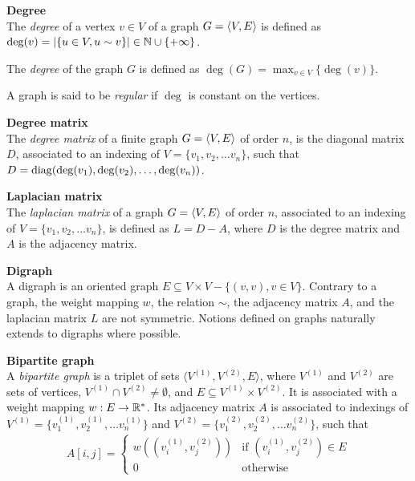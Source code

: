 \begin{definition}\textbf{Degree}\\
The \emph{degree} of a vertex $v \in V$ of a graph $G = \langle V, E \rangle$ is defined as $\deg(v) = |\{u \in V, u \sim v\}| \in \mathbb{N} \cup \{+\infty\}$.

The \emph{degree} of the graph $G$ is defined as $\deg(G) = \displaystyle \max_{v \in V}\{\deg(v)\}$.

A graph is said to be \emph{regular} if $\deg$ is constant on the vertices.
\end{definition}

\begin{definition}\textbf{Degree matrix}\\
The \emph{degree matrix} of a finite graph $G = \langle V, E \rangle$ of order $n$, is the diagonal matrix $D$, associated to an indexing of $V = \{v_1, v_2, \ldots v_n\}$, such that $D = \operatorname{diag}(\deg(v_1), \deg(v_2), \ldots, \deg(v_n))$.
\end{definition}

\begin{definition}\textbf{Laplacian matrix}\\
The \emph{laplacian matrix} of a graph $G = \langle V, E \rangle$ of order $n$, associated to an indexing of $V = \{v_1, v_2, \ldots v_n\}$, is defined as $L = D - A$, where $D$ is the degree matrix and $A$ is the adjacency matrix.
\end{definition}

\begin{definition}\textbf{Digraph}\\
A digraph is an oriented graph \ie $E \subseteq V \times V - \{(v,v), v \in V\}$. Contrary to a graph, the weight mapping $w$, the relation $\sim$, the adjacency matrix $A$, and the laplacian matrix $L$ are not symmetric. Notions defined on graphs naturally extends to digraphs where possible.
\end{definition}

\begin{definition}\textbf{Bipartite graph}\\
A \emph{bipartite graph} is a triplet of sets $\langle V^{(1)}, V^{(2)}, E \rangle$, where $V^{(1)}$ and $V^{(2)}$ are sets of vertices, $V^{(1)} \cap V^{(2)} \neq \emptyset$, and $E \subseteq V^{(1)} \times V^{(2)}$. It is associated with a weight mapping $w: E \rightarrow \mathbb{R}^*$. Its adjacency matrix $A$ is associated to indexings of $V^{(1)} = \{v^{(1)}_1, v^{(1)}_2, \ldots v^{(1)}_n\}$ and $V^{(2)} = \{v^{(2)}_1, v^{(2)}_2, \ldots v^{(2)}_n\}$, such that
\begin{gather*}
A[i,j] =
 \begin{cases}
   w\left((v^{(1)}_i,v^{(2)}_j)\right) & \text{if } (v^{(1)}_i,v^{(2)}_j) \in E \\
   0 & \text{otherwise}
 \end{cases}
\end{gather*}
\end{definition}


